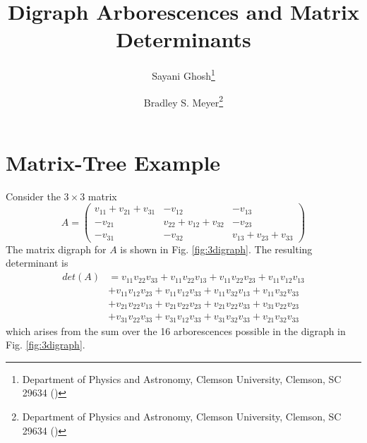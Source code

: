 \documentclass[review,supplement,hidelinks,onefignum,onetabnum]{siamart220329}
\begin{document}
\title{Digraph Arborescences and Matrix Determinants}
\author{Sayani Ghosh\thanks{Department of Physics and Astronomy, Clemson University, Clemson, SC 29634 ({})} \and Bradley S. Meyer\thanks{Department of Physics and Astronomy, Clemson University, Clemson, SC 29634
({)}}}

\maketitle

\section{Matrix-Tree Example}
Consider the $3 \times 3$ matrix
\begin{equation}
    A = \begin{pmatrix}
v_{11} + v_{21} + v_{31} & -v_{12} & -v_{13}\\
-v_{21} & v_{22} + v_{12} + v_{32} & -v_{23} \\
-v_{31}  & -v_{32}& v_{13} + v_{23} + v_{33}
\end{pmatrix}
\label{eq:A}
\end{equation}
The matrix digraph for $A$ is shown in Fig. \ref{fig:3digraph}. The resulting determinant is
\begin{equation}
\begin{split}
    det(A) &= v_{11} v_{22} v_{33} + v_{11} v_{22} v_{13} + v_{11} v_{22} v_{23} + v_{11} v_{12} v_{13} \\
    &+ v_{11} v_{12} v_{23} + v_{11} v_{12} v_{33}
    + v_{11} v_{32} v_{13} + v_{11} v_{32} v_{33} \\
    &+ v_{21} v_{22} v_{13} + v_{21} v_{22} v_{23} + v_{21} v_{22} v_{33} + v_{31} v_{22} v_{23} \\
    &+ v_{31} v_{22} v_{33} + v_{31} v_{12} v_{33} + v_{31} v_{32} v_{33} + v_{21} v_{32} v_{33}
\end{split}
\label{eq:example_det}
\end{equation}
which arises from the sum over the 16 arborescences possible in the digraph in Fig. \ref{fig:3digraph}.
\end{document}
